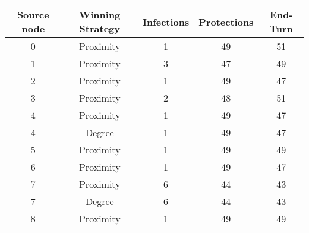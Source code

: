 \documentclass[results.tex]{subfiles}
\begin{document}
    \begin{center}
        \begin{tabular}{| c || c | c | c | c |}
            \hline
            {\bfseries Source node} & {\bfseries Winning Strategy} & {\bfseries Infections} & {\bfseries Protections}
            & {\bfseries End-Turn}
            \\  %
            \hline\hline
            0                       & Proximity                    & 1                      & 49                      & 51                   \\
            \hline
            1                       & Proximity                    & 3                      & 47                      & 49                   \\
            \hline
            2                       & Proximity                    & 1                      & 49                      & 47                   \\
            \hline
            3                       & Proximity                    & 2                      & 48                      & 51                   \\
            \hline
            4                       & Proximity                    & 1                      & 49                      & 47                   \\
            \hline
            4                       & Degree                       & 1                      & 49                      & 47                   \\
            \hline
            5                       & Proximity                    & 1                      & 49                      & 49                   \\
            \hline
            6                       & Proximity                    & 1                      & 49                      & 47                   \\
            \hline
            7                       & Proximity                    & 6                      & 44                      & 43                   \\
            \hline
            7                       & Degree                       & 6                      & 44                      & 43                   \\
            \hline
            8                       & Proximity                    & 1                      & 49                      & 49                   \\

\end{tabular}
\end{center}
\end{document}
